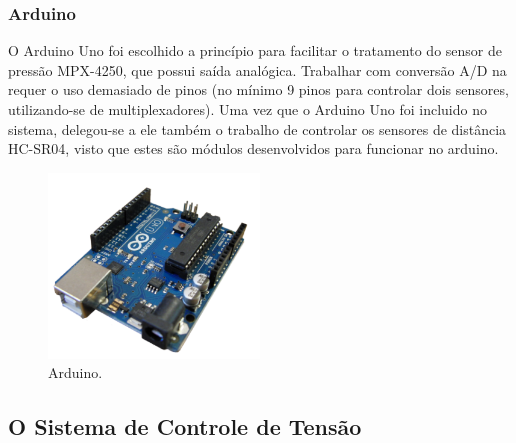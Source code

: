 \subsubsection{Arduino}
O Arduino Uno foi escolhido a princípio para facilitar o tratamento do sensor de pressão \textsf{MPX-4250}, que possui saída analógica. Trabalhar com conversão A/D na \rasp requer o uso demasiado de pinos (no mínimo 9 pinos para controlar dois sensores, utilizando-se de multiplexadores). Uma vez que o Arduino Uno foi incluido no sistema, delegou-se a ele também o trabalho de controlar os sensores de distância \textsf{HC-SR04}, visto que estes são módulos desenvolvidos para funcionar no arduino.
\par
\begin{figure}[h]
  \centering
  \includegraphics[width=0.5\textwidth]{figures/arduino.png}
  \caption{Arduino.}
  \label{fig:arduino}
\end{figure}
\FloatBarrier
\par

\subsection{O Sistema de Controle de Tensão}

